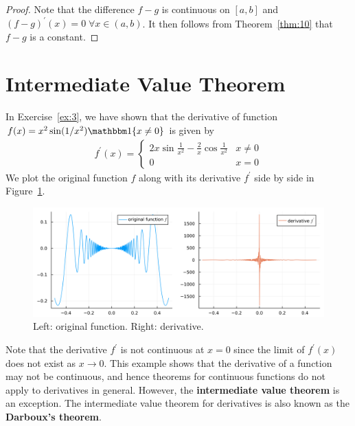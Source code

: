 \documentclass[thmcnt=section, 12pt]{my-elegantbook}
\begin{document}
\begin{proof}
    Note that the difference $f-g$ is continuous on $[a, b]$ and $(f-g)^\prime(x) = 0 \; \forall x \in (a, b)$. It then follows from Theorem~\ref{thm:10} that $f-g$ is a constant.
\end{proof}


\section{Intermediate Value Theorem}

\par In Exercise~\ref{ex:3}, we have shown that the derivative of function $f(x) = x^2 \sin(1/x^2) \ind\{x \neq 0\}$ is given by
\begin{align*}
    f^\prime(x) = \begin{cases}
                      2x \sin \frac{1}{x^2}
                      - \frac{2}{x} \cos \frac{1}{x^2}
                        & x \neq 0 \\
                      0 & x = 0
                  \end{cases}
\end{align*}
We plot the original function $f$ along with its derivative $f^\prime$ side by side in Figure~\ref{fig:4}.
\begin{figure}[ht]
    \centering
    \includegraphics[scale=0.2]{figures/graph-004.png}
    \caption{Left: original function. Right: derivative.}
    \label{fig:4}
\end{figure}

\noindent Note that the derivative $f^\prime$ is not continuous at $x = 0$ since the limit of $f^\prime(x)$ does not exist as $x \to 0$. This example shows that the derivative of a function may not be continuous, and hence theorems for continuous functions do not apply to derivatives in general. However, the \textbf{intermediate value theorem} is an exception. The intermediate value theorem for derivatives is also known as the \textbf{Darboux's theorem}.
\end{document}
